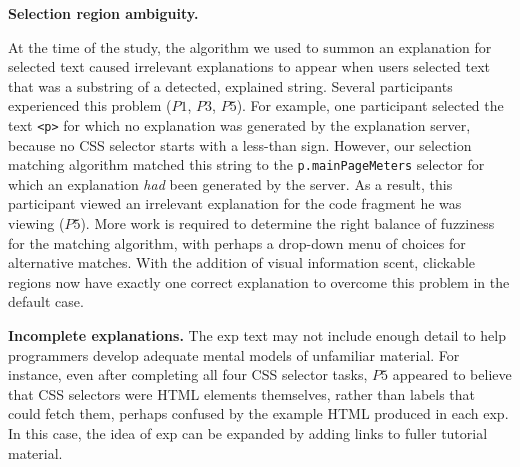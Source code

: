 {\bf Selection region ambiguity.}
\begin{changes}
At the time of the study, the algorithm we used to summon an explanation for selected text caused irrelevant explanations to appear when users selected text that was a substring of a detected, explained string.
Several participants experienced this problem ($P1$, $P3$, $P5$).
For example, one participant selected the text \texttt{<p>} for which no explanation was generated by the explanation server, because no CSS selector starts with a less-than sign.
However, our selection matching algorithm matched this string to the \texttt{p.mainPageMeters} selector for which an explanation \emph{had} been generated by the server.
As a result, this participant viewed an irrelevant explanation for the code fragment he was viewing ($P5$).
More work is required to determine the right balance of fuzziness for the matching algorithm, with perhaps a drop-down menu of choices for alternative matches.
\fi
With the addition of visual information scent, clickable regions now have exactly one correct explanation to overcome this problem in the default case.
\end{changes}

{\bf Incomplete explanations.} The  \gls{exp} text may not include enough detail to help programmers  develop adequate mental models of unfamiliar material. For instance,
even after completing all four CSS selector tasks, $P5$ appeared to believe that CSS selectors were HTML elements themselves, rather than labels that could fetch them, perhaps confused by the example HTML produced in each \gls{exp}.
In this case, the idea of \gls{exp} can be expanded by adding links to fuller tutorial material.
